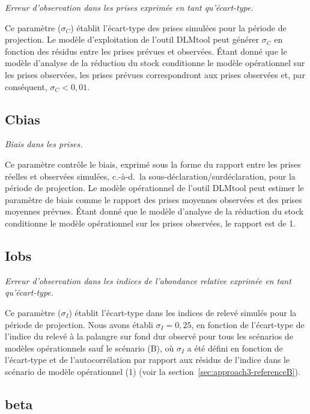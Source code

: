 \documentclass[french,11pt]{book}
\begin{document}
\emph{Erreur d'observation dans les prises exprimée en tant qu'écart-type.}

Ce paramètre (\(\sigma_C\)) établit l'écart-type des prises simulées pour la période de projection. Le modèle d'exploitation de l'outil DLMtool peut générer \(\sigma_C\) en fonction des résidus entre les prises prévues et observées. Étant donné que le modèle d'analyse de la réduction du stock conditionne le modèle opérationnel sur les prises observées, les prises prévues correspondront aux prises observées et, par conséquent, \(\sigma_C < 0,01\).

\subsection{Cbias}
\label{app:desc-obs-cbias-yelloweye}

\emph{Biais dans les prises.}

Ce paramètre contrôle le biais, exprimé sous la forme du rapport entre les prises réelles et observées simulées, c.-à-d.~la sous-déclaration/surdéclaration, pour la période de projection. Le modèle opérationnel de l'outil DLMtool peut estimer le paramètre de biais comme le rapport des prises moyennes observées et des prises moyennes prévues. Étant donné que le modèle d'analyse de la réduction du stock conditionne le modèle opérationnel sur les prises observées, le rapport est de 1.

\subsection{Iobs}
\label{app:desc-obs-iobs-yelloweye}

\emph{Erreur d'observation dans les indices de l'abondance relative exprimée en tant qu'écart-type.}

Ce paramètre (\(\sigma_I\)) établit l'écart-type dans les indices de relevé simulés pour la période de projection. Nous avons établi \(\sigma_I = 0,25\), en fonction de l'écart-type de l'indice du relevé à la palangre sur fond dur observé pour tous les scénarios de modèles opérationnels sauf le scénario (B), où \(\sigma_I\) a été défini en fonction de l'écart-type et de l'autocorrélation par rapport aux résidus de l'indice dans le scénario de modèle opérationnel (1) (voir la section~\ref{sec:approach3-referenceB}).

\subsection{beta}
\label{app:desc-obs-beta-yelloweye}
\end{document}
